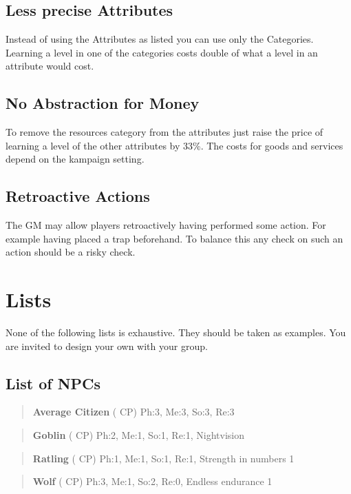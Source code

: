 \documentclass[11pt]{article}
\begin{document}
{\subsection{Less precise Attributes}
\label{sec:orge390d39}
Instead of using the Attributes as listed you can use only the Categories. Learning a level in one of the categories costs double of what a level in an attribute would cost.

\subsection{No Abstraction for Money}
\label{sec:org0ae51e2}
To remove the resources category from the attributes just raise the price of learning a level of the other attributes by 33\%. The costs for goods and services depend on the kampaign setting.

\subsection{Retroactive Actions}
\label{sec:org24422c4}
The GM may allow players retroactively having performed some action. For example having placed a trap beforehand. To balance this any check on such an action should be a risky check.


\newpage
\section{Lists}
\label{sec:org4197b68}
None of the following lists is exhaustive. They should be taken as examples. You are invited to design your own with your group.

\subsection{List of NPCs}
\label{sec:orgedf4049}
\begin{quote}
\textbf{Average Citizen} ( CP)
Ph:3, Me:3, So:3, Re:3
\end{quote}

\begin{quote}
\textbf{Goblin} ( CP)
Ph:2, Me:1, So:1, Re:1, Nightvision
\end{quote}

\begin{quote}
\textbf{Ratling} ( CP)
Ph:1, Me:1, So:1, Re:1, Strength in numbers 1
\end{quote}

\begin{quote}
\textbf{Wolf} ( CP)
Ph:3, Me:1, So:2, Re:0, Endless endurance 1
\end{quote}

}
\end{document}
